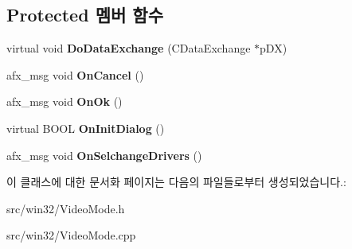 \subsection*{Protected 멤버 함수}
\begin{DoxyCompactItemize}
\item 
\mbox{\label{class_video_driver_select_a47e5d56d294f03dd184e2d4b28f38d4c}} 
virtual void {\bfseries Do\+Data\+Exchange} (C\+Data\+Exchange $\ast$p\+DX)
\item 
\mbox{\label{class_video_driver_select_a99f4c0111aa492baa088621c1e615168}} 
afx\+\_\+msg void {\bfseries On\+Cancel} ()
\item 
\mbox{\label{class_video_driver_select_ac9cbbcd8f906e21b7f7fb5cce824b7b8}} 
afx\+\_\+msg void {\bfseries On\+Ok} ()
\item 
\mbox{\label{class_video_driver_select_a3f6aa71282c6849f1f4841867768eaaf}} 
virtual B\+O\+OL {\bfseries On\+Init\+Dialog} ()
\item 
\mbox{\label{class_video_driver_select_a2b1a9be6efd33676c0c6db48d24e9a55}} 
afx\+\_\+msg void {\bfseries On\+Selchange\+Drivers} ()
\end{DoxyCompactItemize}


이 클래스에 대한 문서화 페이지는 다음의 파일들로부터 생성되었습니다.\+:\begin{DoxyCompactItemize}
\item 
src/win32/Video\+Mode.\+h\item 
src/win32/Video\+Mode.\+cpp\end{DoxyCompactItemize}
